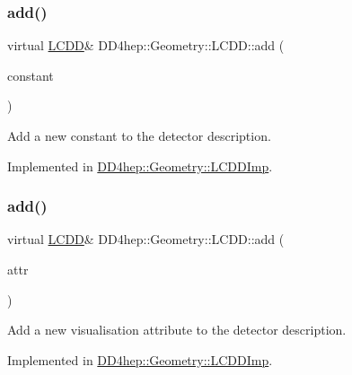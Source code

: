 \subsubsection{\texorpdfstring{add()}{add()}\hspace{0.1cm}{\footnotesize\ttfamily [1/10]}}
{\footnotesize\ttfamily virtual \hyperlink{class_d_d4hep_1_1_geometry_1_1_l_c_d_d}{L\+C\+DD}\& D\+D4hep\+::\+Geometry\+::\+L\+C\+D\+D\+::add (\begin{DoxyParamCaption}\item[{\hyperlink{class_d_d4hep_1_1_geometry_1_1_constant}{Constant}}]{constant }\end{DoxyParamCaption})\hspace{0.3cm}{\ttfamily [pure virtual]}}



Add a new constant to the detector description. 



Implemented in \hyperlink{class_d_d4hep_1_1_geometry_1_1_l_c_d_d_imp_aad80a2a7fab34d16dfdc2da299076dab}{D\+D4hep\+::\+Geometry\+::\+L\+C\+D\+D\+Imp}.

\hypertarget{class_d_d4hep_1_1_geometry_1_1_l_c_d_d_a4913f783de23fed9eb9dc11678226aa8}{}\label{class_d_d4hep_1_1_geometry_1_1_l_c_d_d_a4913f783de23fed9eb9dc11678226aa8} 
\subsubsection{\texorpdfstring{add()}{add()}\hspace{0.1cm}{\footnotesize\ttfamily [2/10]}}
{\footnotesize\ttfamily virtual \hyperlink{class_d_d4hep_1_1_geometry_1_1_l_c_d_d}{L\+C\+DD}\& D\+D4hep\+::\+Geometry\+::\+L\+C\+D\+D\+::add (\begin{DoxyParamCaption}\item[{\hyperlink{class_d_d4hep_1_1_geometry_1_1_vis_attr}{Vis\+Attr}}]{attr }\end{DoxyParamCaption})\hspace{0.3cm}{\ttfamily [pure virtual]}}



Add a new visualisation attribute to the detector description. 



Implemented in \hyperlink{class_d_d4hep_1_1_geometry_1_1_l_c_d_d_imp_a43d0c83fce1485a129e721f0efa9ea6a}{D\+D4hep\+::\+Geometry\+::\+L\+C\+D\+D\+Imp}.

